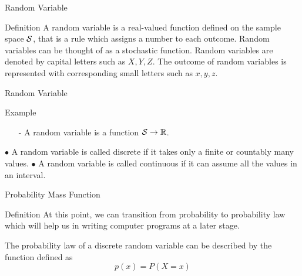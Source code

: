 \documentclass[aspectratio=169,xcolor=dvipsnames,svgnames,x11names,fleqn]{beamer}
\begin{document}
\begin{frame}
    \subsectionpage
\end{frame}


\begin{frame}[containsverbatim]{Random Variable}
    \begin{tblock}{Definition}
        A random variable is a real-valued function defined on the sample space ${\mathcal S}$, that is a rule which assigns a number to each outcome. Random variables can be thought of as a stochastic function. Random variables are denoted by capital letters such as $X, Y, Z$. The outcome of random variables is represented with corresponding small letters such as $x, y, z$.
    
    \end{tblock}

\end{frame}



\begin{frame}[containsverbatim]{Random Variable}
    \begin{tblock}{Example}

        {\color{blue}{For example, the probability that a random variable takes the value of 2 would be expressed as $P(X = 2)$ where $x = 2$.}}
    
        
        \begin{itemize}
            \item[-] A random variable is a function ${\mathcal S} \to {\mathbb R}$.
        \end{itemize}
    
    $\bullet$ A random variable is called discrete if it takes only a finite or countably many values.\newline
    $\bullet$ A random variable is called continuous if it can assume all the values in an interval.
    \end{tblock}
    
\end{frame}

\begin{frame}[containsverbatim]{Probability Mass Function}
    
    \begin{gradblock}{Definition}
        At this point, we can transition from probability to probability law which will help us in writing computer programs at a later stage.
    
        The probability law of a discrete random variable can be described by the function defined as 
        \begin{equation}
            p(x) = P(X = x)
        \end{equation}
    \end{gradblock}

\end{frame}
\end{document}
